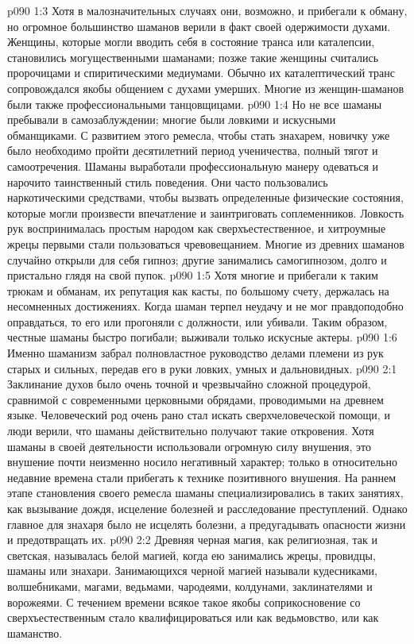 \vs p090 1:3 Хотя в малозначительных случаях они, возможно, и прибегали к обману, но огромное большинство шаманов верили в факт своей одержимости духами. Женщины, которые могли вводить себя в состояние транса или каталепсии, становились могущественными шаманами; позже такие женщины считались пророчицами и спиритическими медиумами. Обычно их каталептический транс сопровождался якобы общением с духами умерших. Многие из женщин\hyp{}шаманов были также профессиональными танцовщицами.
\vs p090 1:4 Но не все шаманы пребывали в самозаблуждении; многие были ловкими и искусными обманщиками. С развитием этого ремесла, чтобы стать знахарем, новичку уже было необходимо пройти десятилетний период ученичества, полный тягот и самоотречения. Шаманы выработали профессиональную манеру одеваться и нарочито таинственный стиль поведения. Они часто пользовались наркотическими средствами, чтобы вызвать определенные физические состояния, которые могли произвести впечатление и заинтриговать соплеменников. Ловкость рук воспринималась простым народом как сверхъестественное, и хитроумные жрецы первыми стали пользоваться чревовещанием. Многие из древних шаманов случайно открыли для себя гипноз; другие занимались самогипнозом, долго и пристально глядя на свой пупок.
\vs p090 1:5 Хотя многие и прибегали к таким трюкам и обманам, их репутация как касты, по большому счету, держалась на несомненных достижениях. Когда шаман терпел неудачу и не мог правдоподобно оправдаться, то его или прогоняли с должности, или убивали. Таким образом, честные шаманы быстро погибали; выживали только искусные актеры.
\vs p090 1:6 Именно шаманизм забрал полновластное руководство делами племени из рук старых и сильных, передав его в руки ловких, умных и дальновидных.
\vs p090 2:1 Заклинание духов было очень точной и чрезвычайно сложной процедурой, сравнимой с современными церковными обрядами, проводимыми на древнем языке. Человеческий род очень рано стал искать сверхчеловеческой помощи,  и люди верили, что шаманы действительно получают такие откровения. Хотя шаманы в своей деятельности использовали огромную силу внушения, это внушение почти неизменно носило негативный характер; только в относительно недавние времена стали прибегать к технике позитивного внушения. На раннем этапе становления своего ремесла шаманы специализировались в таких занятиях, как вызывание дождя, исцеление болезней и расследование преступлений. Однако главное для знахаря было не исцелять болезни, а предугадывать опасности жизни и предотвращать их.
\vs p090 2:2 Древняя черная магия, как религиозная, так и светская, называлась белой магией, когда ею занимались жрецы, провидцы, шаманы или знахари. Занимающихся черной магией называли кудесниками, волшебниками, магами, ведьмами, чародеями, колдунами, заклинателями и ворожеями. С течением времени всякое такое якобы соприкосновение со сверхъестественным стало квалифицироваться или как ведьмовство, или как шаманство.
